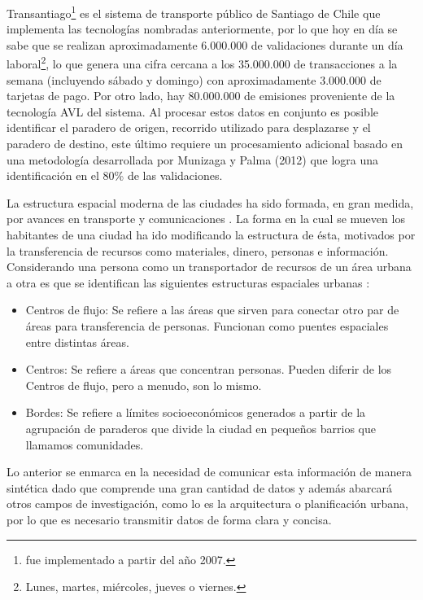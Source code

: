\documentclass[12pt]{article}
\begin{document}
    Transantiago\footnote{fue implementado a partir del año 2007.} es el sistema de transporte público de Santiago de Chile que implementa las tecnologías nombradas anteriormente, por lo que hoy en día se sabe que se realizan aproximadamente 6.000.000 de validaciones durante un día laboral\footnote{Lunes, martes, miércoles, jueves o viernes.}, lo que genera una cifra cercana a los 35.000.000 de transacciones a la semana (incluyendo sábado y domingo) con aproximadamente 3.000.000 de tarjetas de pago. Por otro lado, hay 80.000.000 de emisiones proveniente de la tecnología AVL del sistema. Al procesar estos datos en conjunto es posible identificar el paradero de origen, recorrido utilizado para desplazarse y el paradero de destino, este último requiere un procesamiento adicional basado en una metodología desarrollada por Munizaga y Palma (2012) \cite{Procesamiento_datos} que logra una identificación en el 80\% de las validaciones.

    La estructura espacial moderna de las ciudades ha sido formada, en gran medida, por avances en transporte y comunicaciones \cite{Forma_ciudad_moderna}. La forma en la cual se mueven los habitantes de una ciudad ha ido modificando la estructura de ésta, motivados por la transferencia de recursos como materiales, dinero, personas e información. Considerando una persona como un transportador de recursos de un área urbana a otra es que se identifican las siguientes estructuras espaciales urbanas \cite{Estructura_urbana}:

    \begin{itemize}
    \item Centros de flujo: Se refiere a las áreas que sirven para conectar otro par de áreas para transferencia de personas. Funcionan como puentes espaciales entre distintas áreas.
    \item Centros: Se refiere a áreas que concentran personas. Pueden diferir de los Centros de flujo, pero a menudo, son lo mismo.
    \item Bordes: Se refiere a límites socioeconómicos generados a partir de la agrupación de paraderos que divide la ciudad en pequeños barrios que llamamos comunidades.
    \end{itemize}


    Lo anterior se enmarca en la necesidad de comunicar esta información de manera sintética dado que comprende una gran cantidad de datos y además abarcará otros campos de investigación, como lo es la arquitectura o planificación urbana, por lo que es necesario transmitir datos de forma clara y concisa.
\end{document}
